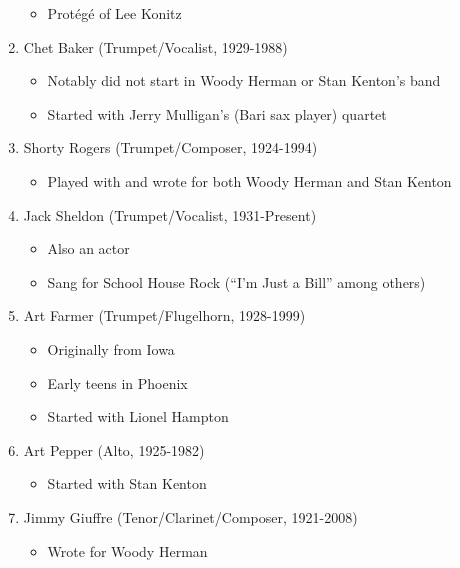 \documentclass[]{article}
\providecommand{\tightlist}{%
  \setlength{\itemsep}{0pt}\setlength{\parskip}{0pt}}
\begin{document}
\begin{enumerate}
  \begin{itemize}
  \tightlist
  \item
    Protégé of Lee Konitz
  \end{itemize}
\item
  Chet Baker (Trumpet/Vocalist, 1929-1988)

  \begin{itemize}
  \tightlist
  \item
    Notably did not start in Woody Herman or Stan Kenton's band
  \item
    Started with Jerry Mulligan's (Bari sax player) quartet
  \end{itemize}
\item
  Shorty Rogers (Trumpet/Composer, 1924-1994)

  \begin{itemize}
  \tightlist
  \item
    Played with and wrote for both Woody Herman and Stan Kenton
  \end{itemize}
\item
  Jack Sheldon (Trumpet/Vocalist, 1931-Present)

  \begin{itemize}
  \tightlist
  \item
    Also an actor
  \item
    Sang for School House Rock (``I'm Just a Bill'' among others)
  \end{itemize}
\item
  Art Farmer (Trumpet/Flugelhorn, 1928-1999)

  \begin{itemize}
  \tightlist
  \item
    Originally from Iowa
  \item
    Early teens in Phoenix
  \item
    Started with Lionel Hampton
  \end{itemize}
\item
  Art Pepper (Alto, 1925-1982)

  \begin{itemize}
  \tightlist
  \item
    Started with Stan Kenton
  \end{itemize}
\item
  Jimmy Giuffre (Tenor/Clarinet/Composer, 1921-2008)

  \begin{itemize}
  \tightlist
  \item
    Wrote for Woody Herman


\end{itemize}
\end{enumerate}
\end{document}
